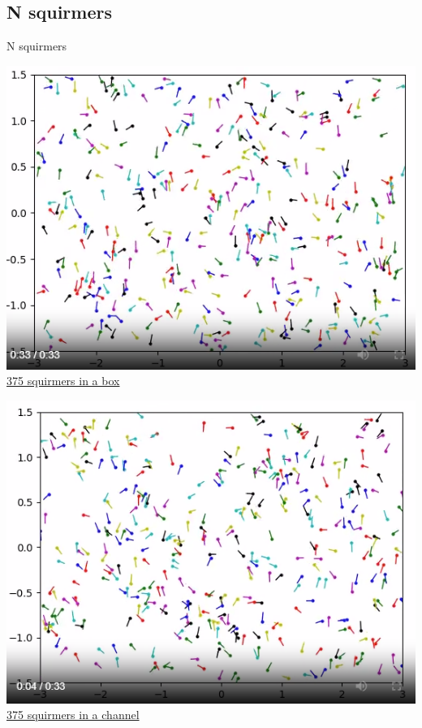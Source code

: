 \documentclass{beamer}
\begin{document}
\subsection{N squirmers}
\begin{frame}{N squirmers}
    \begin{minipage}{0.49\textwidth}
        \includegraphics[width=1\textwidth]{../images/simulation.png}
    \href{https://youtu.be/Uy90m-Cd2AA}{375 squirmers in a box}
    \end{minipage}
    \begin{minipage}{0.49\textwidth}
        \includegraphics[width=1\textwidth]{../images/channel.png}
        \href{https://www.youtube.com/watch?v=wKGb-HLe0Ik}{375 squirmers in a channel}
    \end{minipage}
\end{frame}
\end{document}

